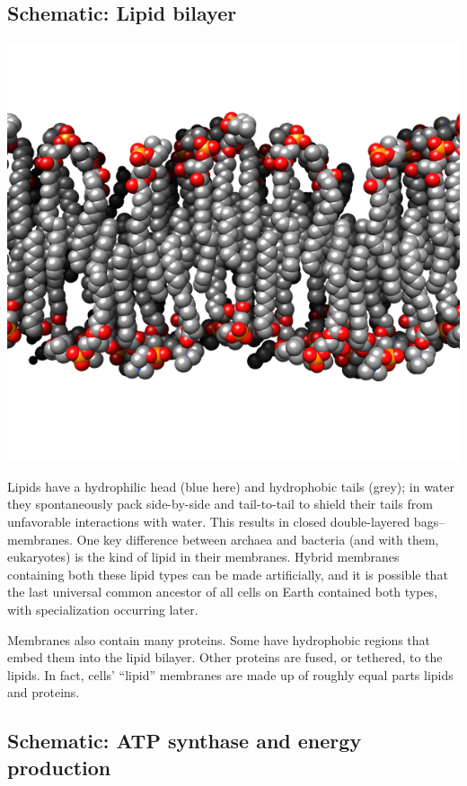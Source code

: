 \documentclass[]{tufte-book}
\begin{document}
\hypertarget{Lipid_bilayer}{%
\subsection*{Schematic: Lipid bilayer}\label{Lipid_bilayer}}

\includegraphics{img/schematics/2_1_1}

Lipids have a hydrophilic head (blue here) and hydrophobic tails (grey); in water they spontaneously pack side-by-side and tail-to-tail to shield their tails from unfavorable interactions with water. This results in closed double-layered bags--membranes. One key difference between archaea and bacteria (and with them, eukaryotes) is the kind of lipid in their membranes. Hybrid membranes containing both these lipid types can be made artificially, and it is possible that the last universal common ancestor of all cells on Earth contained both types, with specialization occurring later.

Membranes also contain many proteins. Some have hydrophobic regions that embed them into the lipid bilayer. Other proteins are fused, or tethered, to the lipids. In fact, cells' ``lipid'' membranes are made up of roughly equal parts lipids and proteins.

\hypertarget{ATP_synthase_and_energy_production}{%
\subsection*{Schematic: ATP synthase and energy production}\label{ATP_synthase_and_energy_production}}
\end{document}
